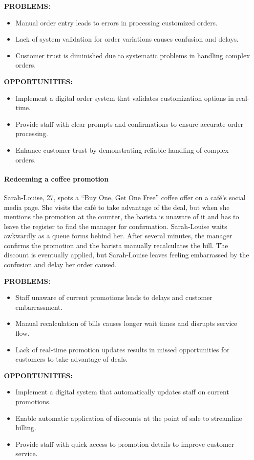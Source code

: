 \documentclass[]{VUMIFTemplateClass}
\newcommand{\subsubsubsection}[1]{\paragraph{#1}}
\begin{document}
\textbf{PROBLEMS:}
\begin{itemize}
    \item Manual order entry leads to errors in processing customized orders.
    \item Lack of system validation for order variations causes confusion and delays.
    \item Customer trust is diminished due to systematic problems in handling complex orders.
\end{itemize}
\textbf{OPPORTUNITIES:}
\begin{itemize}
    \item Implement a digital order system that validates customization options in real-time.
    \item Provide staff with clear prompts and confirmations to ensure accurate order processing.
    \item Enhance customer trust by demonstrating reliable handling of complex orders.
\end{itemize}


\subsubsubsection{Redeeming a coffee promotion}


Sarah‑Louise, 27, spots a “Buy One, Get One Free” coffee offer on a café’s
social media page. She visits the café to take advantage of the deal, but when
she mentions the promotion at the counter, the barista is unaware of it and has
to leave the register to find the manager for confirmation. Sarah‑Louise waits
awkwardly as a queue forms behind her. After several minutes, the manager
confirms the promotion and the barista manually recalculates the bill. The
discount is eventually applied, but Sarah‑Louise leaves feeling embarrassed by
the confusion and delay her order caused.

\textbf{PROBLEMS:}
\begin{itemize}
    \item Staff unaware of current promotions leads to delays and customer embarrassment.
    \item Manual recalculation of bills causes longer wait times and disrupts service flow.
    \item Lack of real-time promotion updates results in missed opportunities for customers to take advantage of deals.
\end{itemize}
\textbf{OPPORTUNITIES:}
\begin{itemize}
    \item Implement a digital system that automatically updates staff on current promotions.
    \item Enable automatic application of discounts at the point of sale to streamline billing.
    \item Provide staff with quick access to promotion details to improve customer service.
\end{itemize}
\end{document}
